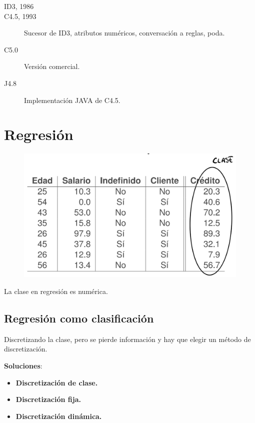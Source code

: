 \documentclass[12pt]{report} %
\begin{document}
\begin{description}
	\item[ID3, 1986]
	\item[C4.5, 1993] Sucesor de ID3, atributos numéricos, conversación a reglas, poda.
	\item[C5.0] Versión comercial.
	\item[J4.8] Implementación JAVA de C4.5.
\end{description}

\chapter{Regresión}
\begin{figure}[H]
	{\includegraphics[scale=.2]{image-20210305210244509.png}}
\end{figure}
La clase en regresión es numérica.

\section{Regresión como
clasificación}

Discretizando la clase, pero se pierde información y hay que elegir un
método de discretización.

\textbf{Soluciones}:

\begin{itemize}

\item
  \textbf{Discretización de clase.}
\item
  \textbf{Discretización fija.}
\item
  \textbf{Discretización dinámica.}
\end{itemize}
\end{document}
